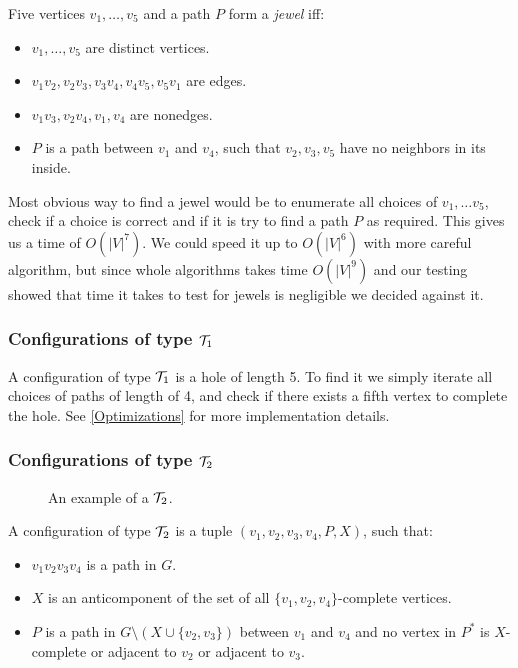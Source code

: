 \documentclass{report}
\begin{document}
Five vertices $v_1, \ldots, v_5$ and a path $P$ form a \emph{jewel} iff:

\begin{itemize}
	\item $v_1, \ldots, v_5$ are distinct vertices.
	\item $v_1v_2, v_2v_3, v_3v_4, v_4v_5, v_5v_1$ are edges.
	\item $v_1v_3, v_2v_4, v_1,v_4$ are nonedges.
	\item $P$ is a path between $v_1$ and $v_4$, such that $v_2, v_3, v_5$ have no neighbors in its inside.
\end{itemize}

Most obvious way to find a jewel would be to enumerate all choices of $v_1, \ldots v_5$, check if a choice is correct and if it is try to find a path $P$ as required. This gives us a time of $O(|V|^7)$. We could speed it up to $O(|V|^6)$ with more careful algorithm, but since whole algorithms takes time $O(|V|^9)$ and our testing showed that time it takes to test for jewels is negligible we decided against it.

\subsubsection{Configurations of type $\mathcal{T}_1$}

A configuration of type $\mathcal{T}_1$ is a hole of length 5. To find it we simply iterate all choices of paths of length of 4, and check if there exists a fifth vertex to complete the hole. See \cref{Optimizations} for more implementation details.

\subsubsection{Configurations of type $\mathcal{T}_2$}

\begin{wrapfigure}{r}{0.35\textwidth}
	
	\caption{An example of a $\mathcal{T}_2$.}%
	\vspace{-1.5cm}
\end{wrapfigure}

A configuration of type $\mathcal{T}_2$ is a tuple $(v_1, v_2, v_3, v_4, P, X)$, such that:
\begin{itemize}
	\item $v_1v_2v_3v_4$ is a path in $G$.
	\item $X$ is an anticomponent of the set of all $\{v_1, v_2, v_4\}$-complete vertices.
	\item $P$ is a path in $G\setminus(X \cup \{v_2, v_3\})$ between $v_1$ and $v_4$ and no vertex in $P^*$ is $X$-complete or adjacent to $v_2$ or adjacent to $v_3$.
\end{itemize}
\end{document}
